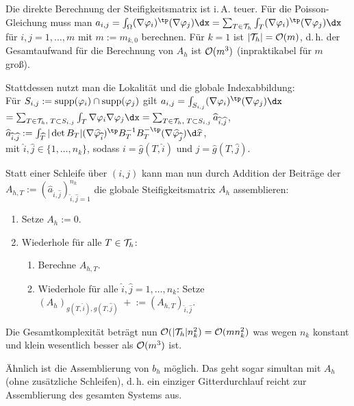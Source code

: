 \begin{Bem}
    Die direkte Berechnung der Steifigkeitsmatrix ist i.\,A. teuer.
    Für die Poisson-Gleichung muss man
    $a_{i,j} = \int_\Omega (\nabla\varphi_i)^\tp (\nabla\varphi_j) \dx
    = \sum_{T \in \T_h} \int_T (\nabla\varphi_i)^\tp (\nabla\varphi_j) \dx$
    für $i,j = 1, \dotsc, m$ mit $m := m_{k,0}$ berechnen.
    Für $k = 1$ ist $|\mathcal{T}_h| = \mathcal{O}(m)$, d.\,h. der Gesamtaufwand für die Berechnung von $A_h$
    ist $\mathcal{O}(m^3)$ (inpraktikabel für $m$ groß).
    
    Stattdessen nutzt man die Lokalität und die globale Indexabbildung:\\
    Für $S_{i,j} := \operatorname{supp}(\varphi_i) \cap \operatorname{supp}(\varphi_j)$ gilt
    $a_{i,j} = \int_{S_{i,j}} (\nabla\varphi_i)^\tp (\nabla\varphi_j) \dx$\\
    $= \sum_{T \in \T_h,\; T \subset S_{i,j}} \int_T \nabla\varphi_i \nabla\varphi_j \dx
    = \sum_{T \in \T_h,\; T \subset S_{i,j}} \widehat{a}_{\widehat{i},\widehat{j}}$,
    $\widehat{a}_{\widehat{i},\widehat{j}}
    := \int_{\widehat{T}} |\det B_T| (\nabla\widehat{\varphi}_{\widehat{i}})^\tp
    B_T^{-1} B_T^{-\tp} (\nabla\widehat{\varphi}_{\widehat{j}}) \d\widehat{x}$,\\
    mit $\widehat{i}, \widehat{j} \in \{1, \dotsc, n_k\}$, sodass
    $i = \widehat{g}(T, \widehat{i})$ und $j = \widehat{g}(T, \widehat{j})$.
    
    Statt einer Schleife über $(i,j)$ kann man nun durch Addition der Beiträge
    der 
    $A_{h,T} := (\widehat{a}_{\widehat{i},\widehat{j}})_{\widehat{i},\widehat{j}=1}^{n_k}$
    die globale Steifigkeitsmatrix $A_h$ assemblieren:
    \begin{enumerate}
        \item
        Setze $A_h := 0$.
        
        \item
        Wiederhole für alle $T \in \mathcal{T}_h$:
        \begin{enumerate}[label=\emph{(\roman*)}]
            \item
            Berechne $A_{h,T}$.
            
            \item
            Wiederhole für alle $\widehat{i}, \widehat{j} = 1, \dotsc, n_k$:
            Setze $(A_h)_{g(T,\widehat{i}),g(T,\widehat{j})} \;+\!\!:=
            (A_{h,T})_{\widehat{i},\widehat{j}}$.
        \end{enumerate}
    \end{enumerate}
    Die Gesamtkomplexität beträgt nun $\mathcal{O}(|\mathcal{T}_h| n_k^2) = \mathcal{O}(mn_k^2)$
    was wegen $n_k$ konstant und klein wesentlich besser als $\mathcal{O}(m^3)$ ist.
    
    Ähnlich ist die Assemblierung von $b_h$ möglich.
    Das geht sogar simultan mit $A_h$ (ohne zusätzliche Schleifen),
    d.\,h. ein einziger Gitterdurchlauf reicht zur Assemblierung des gesamten Systems aus.
\end{Bem}

